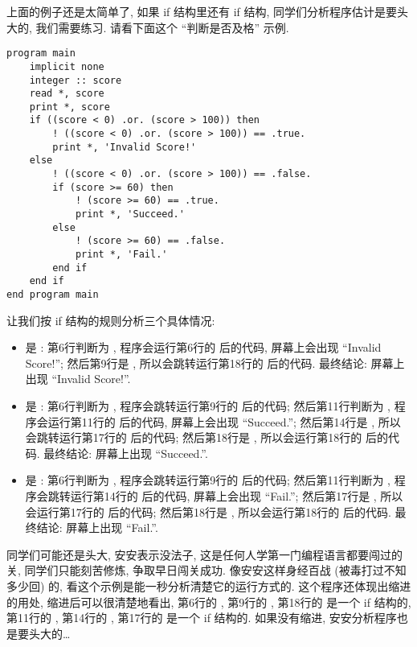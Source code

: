 上面的例子还是太简单了, 如果 if 结构里还有 if 结构, 同学们分析程序估计是要头大的, 我们需要练习. 请看下面这个 ``判断是否及格'' 示例. \label{whether_passed}
\begin{lstlisting}
program main
    implicit none
    integer :: score
    read *, score
    print *, score
    if ((score < 0) .or. (score > 100)) then
        ! ((score < 0) .or. (score > 100)) == .true.
        print *, 'Invalid Score!'
    else
        ! ((score < 0) .or. (score > 100)) == .false.
        if (score >= 60) then
            ! (score >= 60) == .true.
            print *, 'Succeed.'
        else
            ! (score >= 60) == .false.
            print *, 'Fail.'
        end if
    end if
end program main
\end{lstlisting}
让我们按 if 结构的规则分析三个具体情况:
\begin{itemize}
    \item {} 是 : 第6行判断为 , 程序会运行第6行的  后的代码, 屏幕上会出现 ``Invalid Score!''; 然后第9行是 , 所以会跳转运行第18行的  后的代码. 最终结论: 屏幕上出现 ``Invalid Score!''.
    \item {} 是 : 第6行判断为 , 程序会跳转运行第9行的  后的代码; 然后第11行判断为 , 程序会运行第11行的  后的代码, 屏幕上会出现 ``Succeed.''; 然后第14行是 , 所以会跳转运行第17行的  后的代码; 然后第18行是 , 所以会运行第18行的  后的代码. 最终结论: 屏幕上出现 ``Succeed.''.
    \item {} 是 : 第6行判断为 , 程序会跳转运行第9行的  后的代码; 然后第11行判断为 , 程序会跳转运行第14行的  后的代码, 屏幕上会出现 ``Fail.''; 然后第17行是 , 所以会运行第17行的  后的代码; 然后第18行是 , 所以会运行第18行的  后的代码. 最终结论: 屏幕上出现 ``Fail.''.
\end{itemize}
同学们可能还是头大, 安安表示没法子, 这是任何人学第一门编程语言都要闯过的关, 同学们只能刻苦修炼, 争取早日闯关成功. 像安安这样身经百战 (被毒打过不知多少回) 的, 看这个示例是能一秒分析清楚它的运行方式的. 这个程序还体现出缩进的用处, 缩进后可以很清楚地看出, 第6行的 , 第9行的 , 第18行的  是一个 if 结构的, 第11行的 , 第14行的 , 第17行的  是一个 if 结构的. 如果没有缩进, 安安分析程序也是要头大的\dots{}


